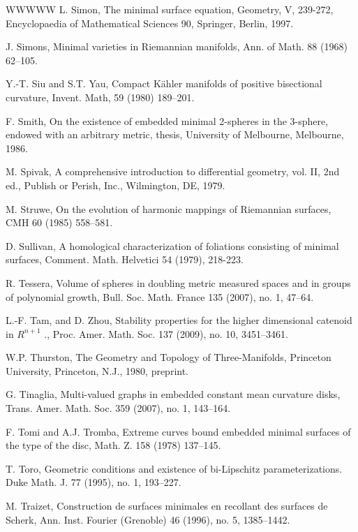 \begin{thebibliography}{WWWWW}
 L. Simon, The minimal surface equation, Geometry, V, 239-272, Encyclopaedia of Mathematical Sciences 90, Springer, Berlin, 1997.

 J. Simons, Minimal varieties in Riemannian manifolds, Ann. of Math. 88 (1968) 62–105.

 Y.-T. Siu and S.T. Yau, Compact Kähler manifolds of positive bisectional curvature, Invent. Math, 59 (1980) 189–201.

 F. Smith, On the existence of embedded minimal 2-spheres in the 3-sphere, endowed with an arbitrary metric, thesis, University of Melbourne, Melbourne, 1986.

 M. Spivak, A comprehensive introduction to differential geometry, vol. II, 2nd ed., Publish or Perish, Inc., Wilmington, DE, 1979.

 M. Struwe, On the evolution of harmonic mappings of Riemannian surfaces, CMH 60 (1985) 558–581.

 D. Sullivan, A homological characterization of foliations consisting of minimal surfaces, Comment. Math. Helvetici 54 (1979), 218-223.

 R. Tessera, Volume of spheres in doubling metric measured spaces and in groups of polynomial growth, Bull. Soc. Math. France 135 (2007), no. 1, 47–64.

 L.-F. Tam, and D. Zhou, Stability properties for the higher dimensional catenoid in $R^{n+1}$ ., Proc. Amer. Math. Soc. 137 (2009), no. 10, 3451–3461.

 W.P. Thurston, The Geometry and Topology of Three-Manifolds, Princeton University, Princeton, N.J., 1980, preprint.

 G. Tinaglia, Multi-valued graphs in embedded constant mean curvature disks, Trans. Amer. Math. Soc. 359 (2007), no. 1, 143–164.

 F. Tomi and A.J. Tromba, Extreme curves bound embedded minimal surfaces of the type of the disc, Math. Z. 158 (1978) 137–145.

 T. Toro, Geometric conditions and existence of bi-Lipschitz parameterizations. Duke Math. J. 77 (1995), no. 1, 193–227.

 M. Traizet, Construction de surfaces minimales en recollant des surfaces de Scherk, Ann. Inst. Fourier (Grenoble) 46 (1996), no. 5, 1385–1442.


\end{thebibliography}

